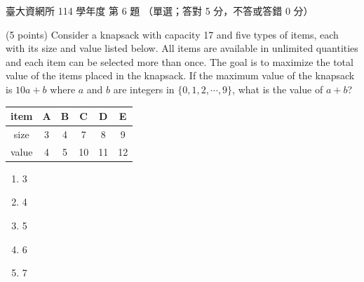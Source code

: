\begin{pastexam}[label={px:ntu-114-dsa-06}]{臺大資網所 114 學年度 第 6 題}
（單選；答對 5 分，不答或答錯 0 分）

(5 points) Consider a knapsack with capacity 17 and five types of items, each with its size and value listed
below. All items are available in unlimited quantities and each item can be selected more than once. The goal is
to maximize the total value of the items placed in the knapsack. If the maximum value of the knapsack is $10a+b$
where $a$ and $b$ are integers in $\{0,1,2,\cdots,9\}$, what is the value of $a+b$?
\begin{center}
\begin{tabular}{c|ccccc}
item & A & B & C & D & E \\ \hline
size & 3 & 4 & 7 & 8 & 9 \\
value & 4 & 5 & 10 & 11 & 12
\end{tabular}
\end{center}
\begin{enumerate}[label=(\Alph*)]
\item 3
\item 4
\item 5
\item 6
\item 7
\end{enumerate}
\end{pastexam}

